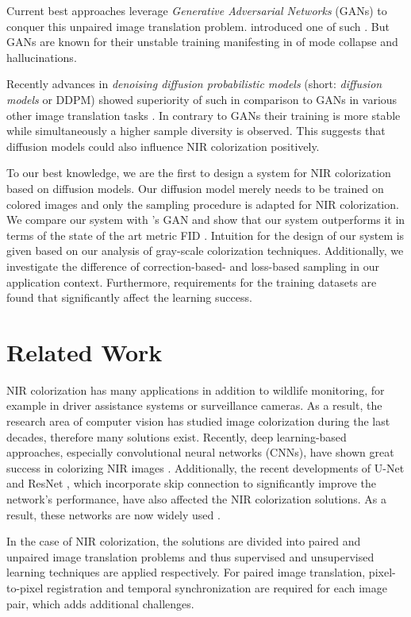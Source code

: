 Current best approaches leverage \textit{Generative Adversarial Networks} (GANs) to conquer this unpaired image translation problem.
 introduced one of such \parencite{mehri}.
But GANs are known for their unstable training manifesting in of mode collapse and hallucinations.

Recently advances in \textit{denoising diffusion probabilistic models} (short: \textit{diffusion models} or DDPM) \parencite{ddpm} showed superiority of such in comparison to GANs in various other image translation tasks \parencite{diffusion-beats-gans,sbgm}.
In contrary to GANs their training is more stable while simultaneously a higher sample diversity is observed.
This suggests that diffusion models could also influence NIR colorization positively.

To our best knowledge, we are the first to design a system for NIR colorization based on diffusion models.
Our diffusion model merely needs to be trained on colored images and only the sampling procedure is adapted for NIR colorization.
We compare our system with \textcite{mehri}'s GAN and show that our system outperforms it in terms of the state of the art metric FID \parencite{ttur}.
Intuition for the design of our system is given based on our analysis of gray-scale colorization techniques.
Additionally, we investigate the difference of correction-based- and loss-based sampling in our application
context.
Furthermore, requirements for the training datasets are found that significantly affect the learning success.

\section{Related Work}
NIR colorization has many applications in addition to wildlife monitoring, for example in driver assistance systems or surveillance cameras.
As a result, the research area of computer vision has studied image colorization during the last decades, therefore many solutions exist.
Recently, deep learning-based approaches, especially convolutional neural networks (CNNs), have shown great success in colorizing NIR images \parencite{limmer}.
Additionally, the recent developments of U-Net \parencite{unet} and ResNet \parencite{resnet}, which incorporate skip connection to significantly improve the network's performance, have also affected
the NIR colorization solutions. As a result, these networks are now widely used \parencite{cyclegan-original,mehri,cut,s-shape}.

In the case of NIR colorization, the solutions are divided into paired and unpaired image translation problems and thus supervised and unsupervised learning techniques are applied respectively.
For paired image translation, pixel-to-pixel registration and temporal synchronization are required for each image pair, which adds additional challenges.

